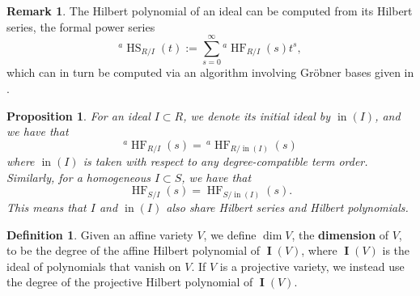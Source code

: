 \documentclass[11pt]{article}
\DeclareMathOperator{\HF}{HF}
\DeclareMathOperator{\HS}{HS}
\DeclareMathOperator{\init}{in}
\DeclareMathOperator{\I}{\mathbf{I}}
\newtheorem{proposition}{Proposition}
\theoremstyle{definition}
\newtheorem{definition}{Definition}
\newtheorem*{remark}{Remark}
\begin{document}
\begin{remark}
	The Hilbert polynomial of an ideal can be computed from its Hilbert series, the formal power series \[ ^a\HS_{R/I}(t) := \sum_{s = 0}^\infty {}^a\HF_{R/I} (s) t^s, \] which can in turn be computed via an algorithm involving Gröbner bases given in \cite{kemper2011course}. 
\end{remark}


\begin{proposition}
	For an ideal $I \subset R$, we denote its initial ideal by $\init(I)$, and we have that \[ ^a\HF_{R/I}(s) = \, ^a\HF_{R/\init(I)}(s) \] where $\init(I)$ is taken with respect to any degree-compatible term order. Similarly, for a homogeneous $I \subset S$, we have that \[ \HF_{S/I}(s) = \HF_{S/\init(I)}(s). \] This means that $I$ and $\init(I)$ also share Hilbert series and Hilbert polynomials. 
\end{proposition}


\begin{definition}
	Given an affine variety $V$, we define $\dim V$, the \textbf{dimension} of $V$, to be the degree of the affine Hilbert polynomial of $\I(V)$, where $\I(V)$ is the ideal of polynomials that vanish on $V$. If $V$ is a projective variety, we instead use the degree of the projective Hilbert polynomial of $\I(V)$. 
\end{definition}
\end{document}
